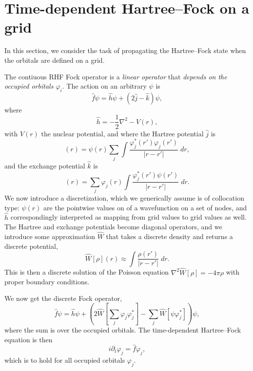 \documentclass[12pt]{article}
\begin{document}
\section{Time-dependent Hartree--Fock on a grid}

In this section, we consider the task of propagating the Hartree--Fock state when the orbitals are defined on a grid.

The contiuous  RHF Fock operator is a \emph{linear operator} that \emph{depends on the occupied orbitals $\varphi_i$}. The action on an arbitrary $\psi$ is
\begin{equation}
    \hat{f} \psi = \hat{h} \psi +  \left( 2 \hat{j} - \hat{k} \right) \psi,
\end{equation}
where
\begin{equation}
    \hat{h} = -\frac{1}{2} \nabla^2 - V(r),
\end{equation}
with $V(r)$ the nuclear potential, and
where the Hartree potential $\hat{j}$ is 
\begin{equation}
    [\hat{j} \psi](r) = \psi(r) \sum_j \int \frac{\varphi_j^*(r') \varphi_j(r')}{|r-r'|} \; dr,
\end{equation}
and the exchange potential $\hat{k}$ is
\begin{equation}
    [\hat{k} \psi](r) = \sum_j \varphi_j(r) \int \frac{\varphi_j^*(r') \psi(r')}{|r-r'|} \; dr.
\end{equation}
We now introduce a discretization, which we generically assume is of collocation type: $\psi(r)$ are the pointwise values on of a wavefunction on a set of nodes, and $\hat{h}$ correspondingly interpreted as mapping from grid values to grid values as well. The Hartree and exchange potentials become diagonal operators, and we introduce some approximation $\hat{W}$ that takes a discrete density and returns a discrete potential, 
\begin{equation}
    \hat{W}[\rho](r) \approx \int \frac{\rho(r')}{|r-r'|} \; dr.
\end{equation}
This is then a discrete solution of the Poisson equation $\nabla^2 \hat{W}[\rho] = -4 \pi \rho$ with proper boundary conditions.

We now get the discrete Fock operator,
\begin{equation}
    \hat{f} \psi = \hat{h} \psi +  \left( 2 \hat{W}[\sum_j \varphi_j\varphi_j^*] - \sum_j \hat{W}[\psi \varphi_j^*] \right) \psi,
\end{equation}
where the sum is over the occupied orbitals. The time-dependent Hartree--Fock equation is then
\begin{equation}
    i \partial_t \varphi_j = \hat{f} \varphi_j,
\end{equation}
which is to hold for all occupied orbitals $\varphi_j$.
\end{document}
